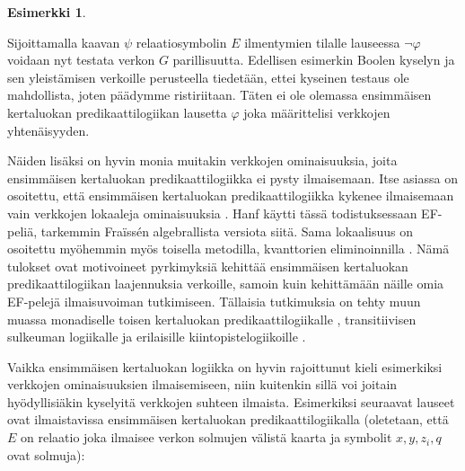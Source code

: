 \documentclass[finnish]{tktltiki2}
\theoremstyle{definition}
\newtheorem{esim}[lau]{Esimerkki}
\theoremstyle{remark}
\begin{document}
\begin{esim}
\begin{center}
\end{center}

Sijoittamalla kaavan $\psi$ relaatiosymbolin $E$ ilmentymien tilalle lauseessa $\neg \varphi$ voidaan nyt testata verkon $G$ parillisuutta. Edellisen esimerkin Boolen kyselyn ja sen yleistämisen verkoille perusteella tiedetään, ettei kyseinen testaus ole mahdollista, joten päädymme ristiriitaan. Täten ei ole olemassa ensimmäisen kertaluokan predikaattilogiikan lausetta $\varphi$ joka määrittelisi verkkojen yhtenäisyyden.
\end{esim}

Näiden lisäksi on hyvin monia muitakin verkkojen ominaisuuksia, joita ensimmäisen kertaluokan predikaattilogiikka ei pysty ilmaisemaan. Itse asiassa on osoitettu, että ensimmäisen kertaluokan predikaattilogiikka kykenee ilmaisemaan vain verkkojen lokaaleja ominaisuuksia \cite{Han65}. Hanf käytti tässä todistuksessaan EF-peliä, tarkemmin Fraïssén algebrallista versiota siitä. Sama lokaalisuus on osoitettu myöhemmin myös toisella metodilla, kvanttorien eliminoinnilla \cite{Gai82}. Nämä tulokset ovat motivoineet pyrkimyksiä kehittää ensimmäisen kertaluokan predikaattilogiikan laajennuksia verkoille, samoin kuin kehittämään näille omia EF-pelejä ilmaisuvoiman tutkimiseen. Tällaisia tutkimuksia on tehty muun muassa monadiselle toisen kertaluokan predikaattilogiikalle \cite{Fag75} \cite{Fag93}, transitiivisen sulkeuman logiikalle \cite{Gra92} ja erilaisille kiintopistelogiikoille \cite{Bos93}.

Vaikka ensimmäisen kertaluokan logiikka on hyvin rajoittunut kieli esimerkiksi verkkojen ominaisuuksien ilmaisemiseen, niin kuitenkin sillä voi joitain hyödyllisiäkin kyselyitä verkkojen suhteen ilmaista. Esimerkiksi seuraavat lauseet ovat ilmaistavissa ensimmäisen kertaluokan predikaattilogiikalla (oletetaan, että $E$ on relaatio joka ilmaisee verkon solmujen välistä kaarta ja symbolit $x, y, z_i, q$ ovat solmuja):
\end{document}
